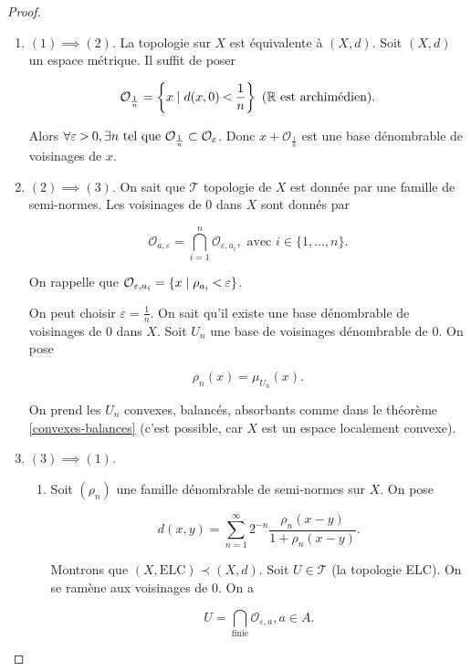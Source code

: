 \documentclass[french]{book}
\theoremstyle{definition}
\theoremstyle{remark}
\newcommand{\lesss}{\rotatebox[origin=c]{90}{$\land$}}
\newcommand{\less}{\ \lesss\ }
\newcommand{\biggg}{\rotatebox[origin=c]{90}{$\lor$}}
\newcommand{\bg}{\ \biggg\ }
\begin{document}
\begin{proof}
  \begin{enumerate}
    \item \((1) \implies (2)\). La topologie sur \(X\) est équivalente à \((X,d)\). Soit \((X,d)\) un espace métrique. Il suffit de poser

    \[\mathcal{O} _{\frac{1}{n}} = \left\{ x \mid d(x,0) \less \frac{1}{n}\right\} \ (\mathbb{R} \text{ est archimédien}). \]

    Alors \(\forall \varepsilon \bg 0, \exists n \text{ tel que } \mathcal{O} _{\frac{1}{n}} \subset \mathcal{O} _{\varepsilon}\). Donc \(x + \mathcal{O} _{\frac{1}{n}}\) est une base dénombrable de voisinages de \(x\).

    \item \((2) \implies (3)\). On sait que \(\mathscr{T}\) topologie de \(X\) est donnée par une famille de semi-normes. Les voisinages de 0 dans \(X\) sont donnés par

    \[\mathcal{O} _{a, \varepsilon} = \bigcap _{i=1} ^{n} \mathcal{O} _{\varepsilon, a_i}, \text{ avec } i \in \{ 1, \dots, n \}.\]

    On rappelle que \(\mathcal{O} _{\varepsilon,a_i} = \{ x \mid \rho _{a_i} \less \varepsilon \}\).

    On peut choisir \(\varepsilon = \frac{1}{n}\). On sait qu'il existe une base dénombrable de voisinages de 0 dans \(X\). Soit \(U_n\) une base de voisinages dénombrable de 0. On pose

    \[\rho_n(x) = \mu _{U_n}(x).\]

    On prend les \(U_n\) convexes, balancés, absorbants comme dans le théorème \ref{convexes-balances} (c'est possible, car \(X\) est un espace localement convexe).

    \item \((3) \implies (1)\).

    \begin{enumerate}
      \item Soit \( (\rho_n)\) une famille dénombrable de semi-normes sur \(X\). On pose

      \[d(x,y) = \sum_{n=1}^{\infty} 2 ^{-n} \frac{\rho_n(x-y)}{1 + \rho_n(x-y)}.\]

      Montrons que \((X, \text{ELC}) \prec (X, d)\). Soit \(U \in \mathscr{T}\) (la topologie ELC). On se ramène aux voisinages de 0. On a

      \[U = \bigcap _{\text{finie}} \mathcal{O} _{\varepsilon, a}, a \in A. \]


\end{enumerate}
\end{enumerate}
\end{proof}
\end{document}
